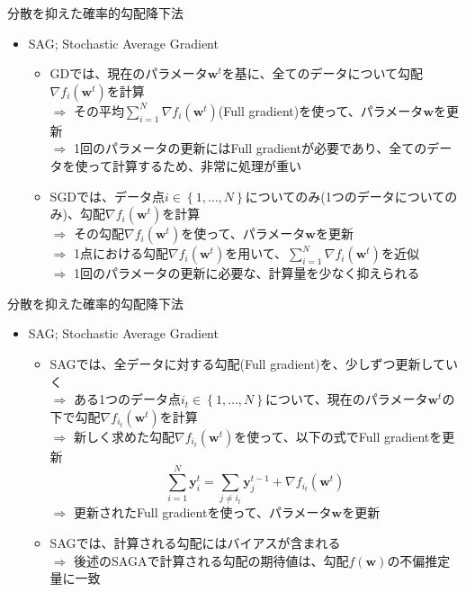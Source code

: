 \documentclass[dvipdfmx,notheorems,t]{beamer}
\begin{document}
\begin{frame}{分散を抑えた確率的勾配降下法}

\begin{itemize}
	\item SAG; Stochastic Average Gradient
	\begin{itemize}
		\item GDでは、現在のパラメータ$\bm{w}^t$を基に、\alert{全てのデータについて}勾配$\nabla f_i(\bm{w}^t)$を計算 \\
		$\Rightarrow$ その平均$\sum_{i = 1}^N \nabla f_i(\bm{w}^t)$(\alert{Full gradient})を使って、パラメータ$\bm{w}$を更新 \\
		$\Rightarrow$ 1回のパラメータの更新にはFull gradientが必要であり、全てのデータを使って計算するため、非常に処理が重い
		\newline
		
		\item SGDでは、データ点$i \in \left\{ 1, \ldots, N \right\}$についてのみ(\alert{1つのデータについてのみ})、勾配$\nabla f_i(\bm{w}^t)$を計算 \\
		$\Rightarrow$ その勾配$\nabla f_i(\bm{w}^t)$を使って、パラメータ$\bm{w}$を更新 \\
		$\Rightarrow$ 1点における勾配$\nabla f_i(\bm{w}^t)$を用いて、$\sum_{i = 1}^N \nabla f_i(\bm{w}^t)$を近似 \\
		$\Rightarrow$ 1回のパラメータの更新に必要な、計算量を少なく抑えられる
	\end{itemize}
\end{itemize}

\end{frame}

\begin{frame}{分散を抑えた確率的勾配降下法}

\begin{itemize}
	\item SAG; Stochastic Average Gradient
	\begin{itemize}		
		\item SAGでは、全データに対する勾配(Full gradient)を、\alert{少しずつ更新していく} \\
		$\Rightarrow$ ある1つのデータ点$i_t \in \left\{ 1, \ldots, N \right\}$について、現在のパラメータ$\bm{w}^t$の下で勾配$\nabla f_{i_t}(\bm{w}^t)$を計算 \\
		$\Rightarrow$ 新しく求めた勾配$\nabla f_{i_t}(\bm{w}^t)$を使って、以下の式でFull gradientを更新 \\
		\begin{equation}
			\sum_{i = 1}^N \bm{y}_i^t = \sum_{j \neq i_t} \bm{y}_j^{t - 1} + \nabla f_{i_t}(\bm{w}^t)
		\end{equation}
		$\Rightarrow$ 更新されたFull gradientを使って、パラメータ$\bm{w}$を更新
		\newline
		
		\item SAGでは、計算される勾配にはバイアスが含まれる \\
		$\Rightarrow$ 後述の\alert{SAGA}で計算される勾配の期待値は、勾配$f(\bm{w})$の不偏推定量に一致
	\end{itemize}
\end{itemize}

\end{frame}
\end{document}
